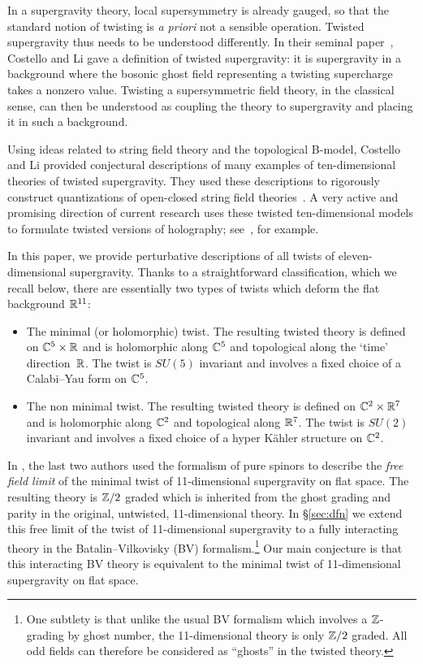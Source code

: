 In a supergravity theory, local supersymmetry is already gauged, so that the standard notion of twisting is {\em a priori} not a sensible operation. Twisted supergravity thus needs to be  understood differently.
In their seminal paper~\cite{CLsugra}, Costello and Li gave a definition of twisted supergravity: it is supergravity in a background where the bosonic ghost field representing a twisting supercharge takes a nonzero value.
Twisting a supersymmetric field theory, in the classical sense, can then be  understood as coupling the theory to supergravity and placing it in such a background.

Using ideas related to string field theory and the topological B-model, Costello and Li provided conjectural descriptions of many examples of ten-dimensional theories of twisted supergravity. They used these descriptions to rigorously construct quantizations of open-closed string field theories~\cite{CLbcov1,CLtypeI}. 
A very active and promising direction of current research uses these twisted ten-dimensional models to formulate twisted versions of holography; see~\cite{Costello_2021, costello2021twisted, Ishtiaque_2020, budzik2021giant}, for example.

In this paper, we provide perturbative descriptions of all twists of eleven-dimensional supergravity. 
Thanks to a straightforward classification, which we recall below, there are essentially two types of twists which deform the flat background $\mathbb R^{11}$: 
\begin{itemize}
\item The minimal (or holomorphic) twist. 
The resulting twisted theory is defined on $\mathbb C^5 \times \mathbb R$ and is holomorphic along $\mathbb C^5$ and topological along the `time' direction~$\mathbb R$. 
The twist is $SU(5)$ invariant and involves a fixed choice of a Calabi--Yau form on $\mathbb C^5$. 
\item The non minimal twist. 
The resulting twisted theory is defined on $\mathbb C^2 \times \mathbb R^7$ and is holomorphic along $\mathbb C^2$ and topological along $\mathbb R^7$.
The twist is $SU(2)$ invariant and involves a fixed choice of a hyper K\"ahler structure on $\mathbb C^2$.  
\end{itemize}

In \cite{SWspinor}, the last two authors used the formalism of pure spinors to describe the {\em free field limit} of the minimal twist of 11-dimensional supergravity on flat space.
The resulting theory is $\mathbb Z/2$ graded which is inherited from the ghost grading and parity in the original, untwisted, 11-dimensional theory.
In \S\ref{sec:dfn} we extend this free limit of the twist of 11-dimensional supergravity to a fully interacting theory in the Batalin--Vilkovisky (BV) formalism.\footnote{One subtlety is that unlike the usual BV formalism which involves a $\mathbb Z$-grading by ghost number, the 11-dimensional theory is only $\mathbb Z/2$ graded.
All odd fields can therefore be considered as ``ghosts'' in the twisted theory.}
Our main conjecture is that this interacting BV theory is equivalent to the minimal twist of 11-dimensional supergravity on flat space.

